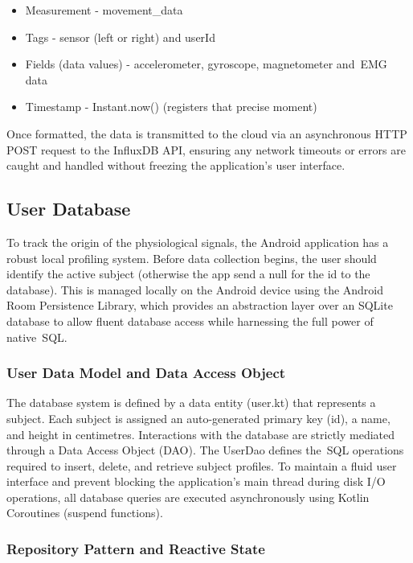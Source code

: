 \begin{itemize}
    \item Measurement - movement\_data
    \item Tags - sensor (left or right) and userId
    \item Fields (data values) - accelerometer, gyroscope, magnetometer and~\gls{EMG} data
    \item Timestamp - Instant.now() (registers that precise moment)
\end{itemize}

Once formatted, the data is transmitted to the cloud via an asynchronous HTTP POST request to the InfluxDB API, ensuring any network timeouts or errors are caught and handled without freezing the application's user interface.

\subsection{User Database}
\label{ssec:android_users}

To track the origin of the physiological signals, the Android application has a robust local profiling system. Before data collection begins, the user should identify the active subject (otherwise the app send a null for the id to the database). 
This is managed locally on the Android device using the Android Room Persistence Library, which provides an abstraction layer over an SQLite database to allow fluent database access while harnessing the full power of native~\gls{SQL}.

\subsubsection{User Data Model and Data Access Object}
\label{sssec:android_users_model}

The database system is defined by a data entity (user.kt) that represents a subject. Each subject is assigned an auto-generated primary key (id), a name, and height in centimetres. 
Interactions with the database are strictly mediated through a Data Access Object (DAO). The UserDao defines the~\gls{SQL} operations required to insert, delete, and retrieve subject profiles. To maintain a fluid user interface and prevent 
blocking the application's main thread during disk I/O operations, all database queries are executed asynchronously using Kotlin Coroutines (suspend functions).

\subsubsection{Repository Pattern and Reactive State}
\label{sssec:android_users_repository}

